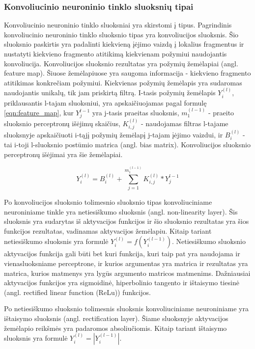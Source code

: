 \subsubsection{Konvoliucinio neuroninio tinklo sluoksnių tipai}

Konvoliucinio neuroninio tinklo sluoksniai yra skirstomi į tipus. Pagrindinis konvoliucinio neuroninio tinklo sluoksnio tipas yra konvoliucijos sluoksnis. Šio sluoksnio paskirtis yra padalinti kiekvieną įėjimo vaizdą į lokalius fragmentus ir nustatyti kiekvieno fragmento atitikimą kiekvienam požymiui naudojantis konvoliucija. Konvoliucijos sluoksnio rezultatas yra požymių žemėlapiai (angl. feature map). Šiuose žemėlapiuose yra saugoma informacija - kiekvieno fragmento atitikimas konkrečiam požymiui. Kiekvienas požymių žemėlapis yra sudaromas naudojantis unikalų, tik jam priskirtą filtrą. I-tasis požymių žemėlapis $Y_i^{(l)}$, priklausantis l-tajam sluoksniui, yra apskaičiuojamas pagal formulę \ref{eqn:feature_map}, kur $Y_j^{l-1}$ yra j-tasis praeitas sluoksnis, $m_1^{(l-1)}$ - praeito sluoksnio perceptronų išėjimų skaičius, $K_{i,j}^{(l)}$ - naudojamas filtras l-tajame sluoksnyje apskaičiuoti i-tąjį požymių žemėlapį j-tajam įėjimo vaizdui, ir $B_i^{(l)}$ - tai i-toji l-sluoksnio postūmio matrica (angl. bias matrix). Konvoliucijos sluoksnio perceptronų išėjimai yra šie žemėlapiai.


\begin{equation}
\label{eqn:feature_map}
	Y_i^{(l)} = B_i^{(l)} + \sum_{j = 1}^{m_1^{(l-1)}} K_{i,j}^{(l)} * Y_j^{l-1}
\end{equation}

Po konvoliucijos sluoksnio tolimesnio sluoksnio tipas konvoliuciniame neuroniniame tinkle yra netiesiškumo sluoksnis (angl. non-linearity layer). Šis sluoksnis yra sudarytas iš aktyvacijos funkcijos ir šio sluoksnio rezultatas yra šios funkcijos rezultatas, vadinamas aktyvacijos žemėlapiu. Kitaip tariant netiesiškumo sluoksnis yra formulė $Y_i^{(l)} = f(Y_i^{(l - 1)})$. Netiesiškumo sluoksnio aktyvacijos funkcija gali būti bet kuri funkcija, kuri taip pat yra naudojama ir vienasluoksniame perceptrone, ir kurios argumentas yra matrica ir rezultatas yra matrica, kurios matmenys yra lygūs argumento matricos matmenims. Dažniausiai aktyvacijos funkcijos yra sigmoidinė, hiperbolinio tangento ir ištaisymo tiesinė (angl. rectified linear function (ReLu)) funkcijos.

Po netiesiškumo sluoksnio tolimesnis sluoksnis konvoliuciniame neuroniniame yra ištaisymo sluoksnis (angl. rectification layer). Šiame sluoksnyje aktyvacijos žemėlapio reikšmės yra padaromos absoliučiomis. Kitaip tariant ištaisymo sluoksnis yra formulė $Y_i^{(l)} = |Y_i^{(l - 1)}|$.

